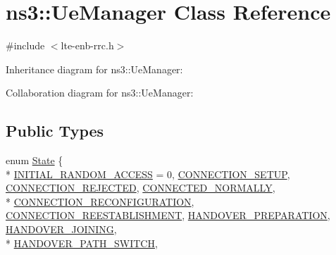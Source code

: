 \hypertarget{classns3_1_1UeManager}{}\section{ns3\+:\+:Ue\+Manager Class Reference}
\label{classns3_1_1UeManager}


{\ttfamily \#include $<$lte-\/enb-\/rrc.\+h$>$}



Inheritance diagram for ns3\+:\+:Ue\+Manager\+:


Collaboration diagram for ns3\+:\+:Ue\+Manager\+:
\subsection*{Public Types}
\begin{DoxyCompactItemize}
\item 
enum \hyperlink{classns3_1_1UeManager_a2f4085fdd18d7125c27da44a5b8b6808}{State} \{ \\*
\hyperlink{classns3_1_1UeManager_a2f4085fdd18d7125c27da44a5b8b6808a6e92e7eaed87665e012ff9c3a4a9e4d3}{I\+N\+I\+T\+I\+A\+L\+\_\+\+R\+A\+N\+D\+O\+M\+\_\+\+A\+C\+C\+E\+SS} = 0, 
\hyperlink{classns3_1_1UeManager_a2f4085fdd18d7125c27da44a5b8b6808a54b5e529e9da2b99970d8939dbd9832e}{C\+O\+N\+N\+E\+C\+T\+I\+O\+N\+\_\+\+S\+E\+T\+UP}, 
\hyperlink{classns3_1_1UeManager_a2f4085fdd18d7125c27da44a5b8b6808a401670e622ea15128374d56a887e602f}{C\+O\+N\+N\+E\+C\+T\+I\+O\+N\+\_\+\+R\+E\+J\+E\+C\+T\+ED}, 
\hyperlink{classns3_1_1UeManager_a2f4085fdd18d7125c27da44a5b8b6808a2a1020dce30f19aa9354ba34b2e7c5e0}{C\+O\+N\+N\+E\+C\+T\+E\+D\+\_\+\+N\+O\+R\+M\+A\+L\+LY}, 
\\*
\hyperlink{classns3_1_1UeManager_a2f4085fdd18d7125c27da44a5b8b6808abd13cee86acc2cb3c04241dec919c73f}{C\+O\+N\+N\+E\+C\+T\+I\+O\+N\+\_\+\+R\+E\+C\+O\+N\+F\+I\+G\+U\+R\+A\+T\+I\+ON}, 
\hyperlink{classns3_1_1UeManager_a2f4085fdd18d7125c27da44a5b8b6808a2e74c6adfadd2e6826deb4fec7e94520}{C\+O\+N\+N\+E\+C\+T\+I\+O\+N\+\_\+\+R\+E\+E\+S\+T\+A\+B\+L\+I\+S\+H\+M\+E\+NT}, 
\hyperlink{classns3_1_1UeManager_a2f4085fdd18d7125c27da44a5b8b6808af12d34cff237916f8322a4b1031ceeda}{H\+A\+N\+D\+O\+V\+E\+R\+\_\+\+P\+R\+E\+P\+A\+R\+A\+T\+I\+ON}, 
\hyperlink{classns3_1_1UeManager_a2f4085fdd18d7125c27da44a5b8b6808a093669f7255c35aa11645ba004a896ea}{H\+A\+N\+D\+O\+V\+E\+R\+\_\+\+J\+O\+I\+N\+I\+NG}, 
\\*
\hyperlink{classns3_1_1UeManager_a2f4085fdd18d7125c27da44a5b8b6808a66ee8994a912a463763b439ac0f158f2}{H\+A\+N\+D\+O\+V\+E\+R\+\_\+\+P\+A\+T\+H\+\_\+\+S\+W\+I\+T\+CH}, 

\end{DoxyCompactItemize}
